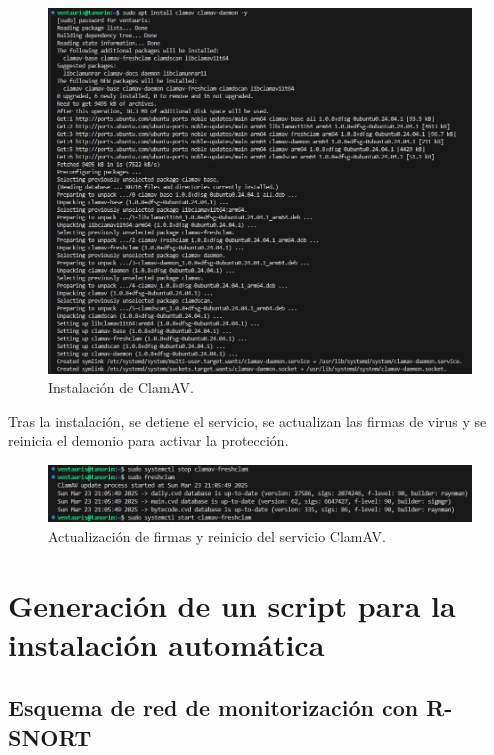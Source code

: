 \documentclass[12pt,a4paper]{report}
\begin{document}
\begin{figure}[H]
	\centering
	\includegraphics[scale=0.6]{clamAV/1.png}
	\caption{Instalación de ClamAV.}
\end{figure}

Tras la instalación, se detiene el servicio, se actualizan las firmas de virus y se reinicia el demonio para activar la protección.

\begin{figure}[H]
	\centering
	\includegraphics[scale=0.6]{clamAV/2.png}
	\caption{Actualización de firmas y reinicio del servicio ClamAV.}
\end{figure}


\newpage


\section{Generación de un script para la instalación automática}

\subsection{Esquema de red de monitorización con R-SNORT}
\end{document}
